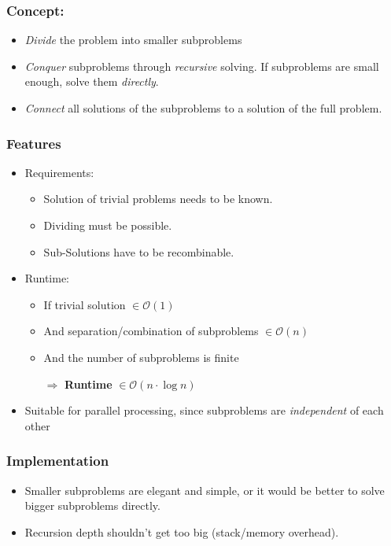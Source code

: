 \documentclass[12pt, a4paper]{scrartcl}
\newcommand{\bigO}{\mathcal{O}}
\renewcommand{\implies}{\Rightarrow}
\begin{document}
\subsubsection*{Concept:}
\begin{itemize}
\item \emph{Divide} the problem into smaller subproblems
\item \emph{Conquer} subproblems through \emph{recursive} solving. If subproblems are small enough, solve them \emph{directly}.
\item \emph{Connect} all solutions of the subproblems to a solution of the full problem.
\end{itemize}

\subsubsection{Features}
\label{sec:O-notation}
\begin{itemize}
\item Requirements:
  \begin{itemize}
  \item Solution of trivial problems needs to be known.
  \item Dividing must be possible.
  \item Sub-Solutions have to be recombinable.
  \end{itemize}
\item Runtime:
  \begin{itemize}
  \item If trivial solution $\in\bigO(1)$
  \item And separation/combination of subproblems $\in\bigO(n)$
  \item And the number of subproblems is finite
  \item[$\implies$] \textbf{Runtime} $\in\bigO(n\cdot\log n)$
  \end{itemize}
\item Suitable for parallel processing, since subproblems are \emph{independent} of each other
\end{itemize}
  
\subsubsection{Implementation}
\label{sec:O-notation}
\begin{itemize}
\item Smaller subproblems are elegant and simple, or it would be better to solve bigger subproblems directly.
\item Recursion depth shouldn't get too big (stack/memory overhead).
\end{itemize}
\end{document}
